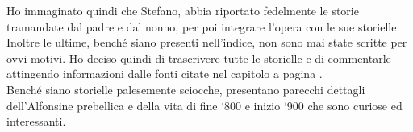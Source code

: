 \begin{figure}[hbt]%
	\vspace{-1cm}
    \centering
    \caption[Fedele e Natale Mingazzi]{}
	\vspace{-0.2cm}
\end{figure}

Ho immaginato quindi che Stefano, abbia riportato fedelmente le storie tramandate dal padre e dal nonno, per poi integrare l'opera con le sue storielle.
Inoltre le ultime, benché siano presenti nell'indice, non sono mai state scritte per ovvi motivi. Ho deciso quindi di trascrivere tutte le storielle e di commentarle attingendo informazioni dalle fonti citate nel capitolo \textit{ }a pagina \pageref{fonti}.\\

Benché siano storielle palesemente sciocche, presentano parecchi dettagli dell'Alfonsine prebellica e della vita di fine `800 e inizio `900 che sono curiose ed interessanti.



